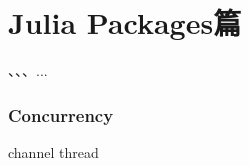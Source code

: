 \newpage
\part{Julia Packages篇}

\HeLY 、\HeJY 、\ZhangLF 、...

\section{Concurrency}
{channel}
{thread}

\newpage
